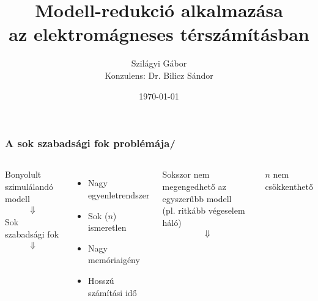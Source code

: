\documentclass[aspectratio=43]{beamer}
\title{Modell-redukció alkalmazása\\az elektromágneses térszámításban}			%
\date{\today}
\author{Szilágyi Gábor\\[3ex]Konzulens: Dr. Bilicz Sándor}	%
\newcommand{\numframetitle}[1]{\frametitle{#1\hfill\insertframenumber/\insertpresentationendpage\hspace{-\fill}}}
\begin{document}
\maketitle	%
\begin{frame}
	\numframetitle{A sok szabadsági fok problémája}
	\begin{columns}
            \begin{center}
    		    Bonyolult szimulálandó modell
                \begin{align*}
                    \Downarrow
                \end{align*}
                Sok szabadsági fok
                \begin{align*}
                    \Downarrow
                \end{align*}
            \end{center}
            \begin{itemize}
                \item Nagy egyenletrendszer
                \item Sok ($n$) ismeretlen
                \item Nagy memóriaigény
                \item Hosszú számítási idő
            \end{itemize}
	        Sokszor nem megengedhető az egyszerűbb modell\\[3ex]
            (pl. ritkább végeselem háló)
            \begin{align*}
                \Downarrow
            \end{align*}
            \begin{center}
                $n$ nem csökkenthető
            \end{center}
    \end{columns}
\end{frame}
\end{document}
